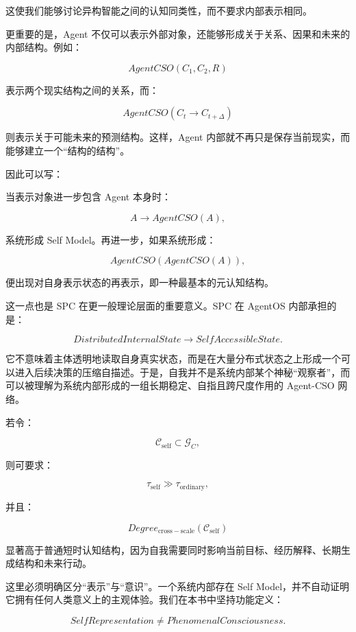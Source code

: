 这使我们能够讨论异构智能之间的认知同类性，而不要求内部表示相同。

更重要的是，Agent 不仅可以表示外部对象，还能够形成关于关系、因果和未来的内部结构。例如：

\[
AgentCSO(C_1,C_2,R)
\]

表示两个现实结构之间的关系，而：

\[
AgentCSO(
C_t
\rightarrow
C_{t+\Delta}
)
\]

则表示关于可能未来的预测结构。这样，Agent 内部就不再只是保存当前现实，而能够建立一个“结构的结构”。

因此可以写：

\begin{statementbox}
\centering
{}
\end{statementbox}

当表示对象进一步包含 Agent 本身时：

\[
A
\rightarrow
AgentCSO(A),
\]

系统形成 Self Model。再进一步，如果系统形成：

\[
AgentCSO(
AgentCSO(A)
),
\]

便出现对自身表示状态的再表示，即一种最基本的元认知结构。

这一点也是 SPC 在更一般理论层面的重要意义。SPC 在 AgentOS 内部承担的是：

\[
DistributedInternalState
\rightarrow
SelfAccessibleState.
\]

它不意味着主体透明地读取自身真实状态，而是在大量分布式状态之上形成一个可以进入后续决策的压缩自描述。于是，自我并不是系统内部某个神秘“观察者”，而可以被理解为系统内部形成的一组长期稳定、自指且跨尺度作用的 Agent-CSO 网络。

若令：

\[
\mathcal C_{\mathrm{self}}
\subset
\mathcal G_C,
\]

则可要求：

\[
\tau_{\mathrm{self}}
\gg
\tau_{\mathrm{ordinary}},
\]

并且：

\[
Degree_{\mathrm{cross-scale}}
(
\mathcal C_{\mathrm{self}}
)
\]

显著高于普通短时认知结构，因为自我需要同时影响当前目标、经历解释、长期生成结构和未来行动。

这里必须明确区分“表示”与“意识”。一个系统内部存在 Self Model，并不自动证明它拥有任何人类意义上的主观体验。我们在本书中坚持功能定义：

\[
\boxed{
SelfRepresentation
\neq
PhenomenalConsciousness.
}
\]

